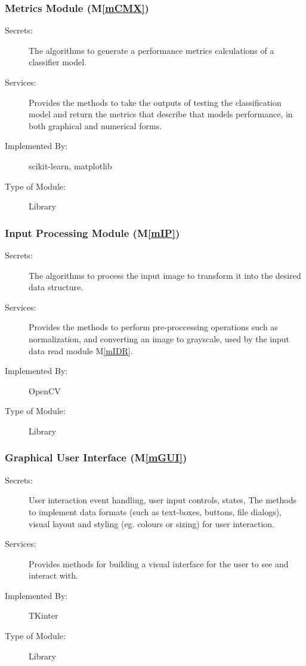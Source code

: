 \documentclass[12pt, titlepage]{article}
\newcommand{\mref}[1]{M\ref{#1}}
\begin{document}
\subsubsection{Metrics Module (\mref{mCMX})}

\begin{description}
\item[Secrets:] The algorithms to generate a performance metrics calculations of a classifier model.
\item[Services:] Provides the methods to take the outputs of testing the classification model and return the metrics that describe
that models performance, in both graphical and numerical forms.
\item[Implemented By:] scikit-learn, matplotlib
\item[Type of Module:] Library
\end{description}

\subsubsection{Input Processing Module (\mref{mIP})}

\begin{description}
\item[Secrets:] The algorithms to process the input image to transform it into the desired data structure.
\item[Services:] Provides the methods to perform pre-proccessing operations such as normalization, and converting an image to grayscale,
used by the input data read module \mref{mIDR}.
\item[Implemented By:] OpenCV
\item[Type of Module:] Library
\end{description}

\subsubsection{Graphical User Interface (\mref{mGUI})}

\begin{description}
\item[Secrets:] User interaction event handling, user input controls, states, The methods to implement data formats (such as text-boxes, buttons, file dialogs),
visual layout and styling (eg. colours or sizing) for user interaction.
\item[Services:] Provides methods for building a visual interface for the user to see and interact with.
\item[Implemented By:] TKinter
\item[Type of Module:] Library
\end{description}
\end{document}

